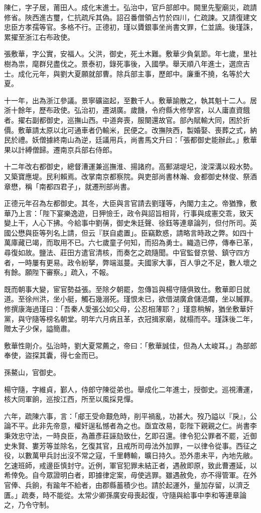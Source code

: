 \begin{pinyinscope}
陳仁，字子居，莆田人。成化末進士。弘治中，官戶部郎中。闕里先聖廟災，疏請修省。陜西進古璽，仁抗疏斥其偽。詔召番僧領占竹於四川，仁疏諫。又請復建文忠臣方孝孺等官。多格不行。正德初，瑾以贗銀事坐尚書文罪，仁並謫。後瑾誅，累擢至浙江右布政使。

張敷華，字公實，安福人。父洪，御史，死土木難。敷華少負氣節。年七歲，里社樹為祟，麾群兒盡伐之。景泰初，錄死事後，入國學。舉天順八年進士，選庶吉士。成化元年，與劉大夏願就部曹。除兵部主事，歷郎中。廉重不撓，名等於大夏。

十一年，出為浙江參議。景寧礦盜起，至數千人。敷華諭散之，執其魁十二人。居浙十餘年，歷布政使。弘治初，遷湖廣。歲饑，令府縣大修學宮，以人庸直資餓者。擢右副都御史，巡撫山西。中道奔喪，服闋還故官。部內賦輸大同，困於折價。敷華請太原以北可通車者仍輸米，民便之。改撫陜西，製婚娶、喪葬之式，納民於禮。妖僧據終南山為逆，廷議用兵，尚書馬文升曰：「張都御史能辦此。」敷華果以計縛僧歸。遷南京兵部右侍郎。

十二年改右都御史，總督漕運兼巡撫淮、揚諸府。高郵湖堤圮，浚深溝以殺水勢。又築寶應堤。民利賴焉。改掌南京都察院。與吏部尚書林瀚、僉都御史林俊、祭酒章懋，稱「南都四君子」，就遷刑部尚書。

正德元年召為左都御史。其冬，大臣與言官請去劉瑾等，內閣力主之。帝猶豫，敷華乃上言：「陛下宴樂逸遊，日狎憸壬，政令與詔旨相背，行事與成憲交乖，致天變上干，人心下拂。今給事中劉蒨，御史朱廷聲、徐鈺等連章論列，但付所司。英國公懋與臣等列名上請，但云『朕自處置」。臣竊歎惑，請略言時政之弊。如四十萬庫藏已竭，而取用不已。六七歲童子何知，而招為勇士。織造已停，傳奉已革，尋復如故。鹽法、莊田方遣官清核，而奏乞之疏隨聞。中官監督京營、鎮守四方者，一時屢有更易。政令紛拏，弊端滋蔓。夫國家大事，百人爭之不足，數人壞之有餘。願陛下審察。」疏入，不報。

既而朝事大變，宦官勢益張。至除夕朝罷，忽傳旨與楊守隨俱致仕。敷華即日就道。至徐州洪，坐小艇，觸石幾溺死。瑾恨未已，欲借湖廣倉儲浥爛，坐以贓罪。修撰康海過瑾曰：「吾秦人愛張公如父母，公忍相薄耶？」瑾意稍解，猶坐敷華奸黨，與守隨等榜名朝堂。明年六月病且革，衣冠揖家廟，就榻而卒。瑾誅後二年，贈太子少保，謚簡肅。

敷華性剛介。弘治時，劉大夏常薦之，帝曰：「敷華誠佳，但為人太峻耳。」為部郎奉使，盜探其囊，得七金而已。

孫鰲山，官御史。

楊守隨，字維貞，鄞人，侍郎守陳從弟也。舉成化二年進士，授御史。巡視漕運，核大同軍餉，巡按江西，所至以風採見憚。

六年，疏陳六事，言：「郕王受命艱危時，削平禍亂，功甚大。歿乃謚以『戾』，公論不平。此非先帝意，權奸逞私憾者為之也。亟宜改易，彰陛下親親之仁。尚書李秉效忠守法，一時良臣，為蕭彥莊誣劾致仕，乞即召還。律令犯公罪者不罷，近御史朱賢、婁芳等並除名，乞復其官，且戒所司毋法外加罪，一以律令從事。西征之役，以數萬甲兵討出沒不常之寇，千里轉輸，曠日持久。恐外患未平，內地先敝。乞速班師，戒邊臣慎封守。近例，軍官犯罪未結正者，遇赦即原，致此曹遷延，以希倖免。自今眾證明白者，即據律定案，毋使逃罪。雖遇赦免，亦不得管軍。在外官俸、兵餉，有踰年不給者，由郡縣蓄積少也。請於起運外，量加存留，以濟乏匱。」疏奏，時不能從。太常少卿孫廣安母喪起復，守隨與給事中李和等連章論之，乃令守制。


\end{pinyinscope}
